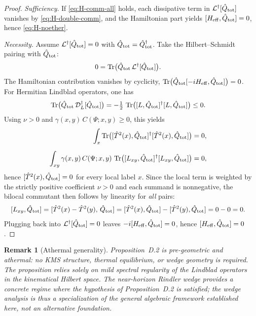 \documentclass[12pt,a4paper]{article}
\newtheorem{remark}{Remark}[section]
\renewcommand{\Tr}{\operatorname{Tr}}
\numberwithin{equation}{section}
\begin{document}
\vspace{0.3cm}
\begin{proof}
\emph{Sufficiency.} If \eqref{eq:H-comm-all} holds, each dissipative term in $\mathcal L^\dagger[\hat Q_{\rm tot}]$ vanishes by \eqref{eq:H-double-comm}, and the Hamiltonian part yields $[H_{\mathrm{eff}},\hat Q_{\rm tot}]=0$, hence \eqref{eq:H-noether}.

\vspace{0.3cm}
\noindent\emph{Necessity.}
Assume $\mathcal L^\dagger[\hat Q_{\rm tot}]=0$ with $\hat Q_{\rm tot}=\hat Q_{\rm tot}^\dagger$.
Take the Hilbert--Schmidt pairing with $\hat Q_{\rm tot}$:
\[
0=\Tr\!\big(\hat Q_{\rm tot}\,\mathcal L^\dagger[\hat Q_{\rm tot}]\big).
\]
The Hamiltonian contribution vanishes by cyclicity,
$\Tr\!\big(\hat Q_{\rm tot}[-iH_{\rm eff},\hat Q_{\rm tot}]\big)=0$.
For Hermitian Lindblad operators, one has
\[
\Tr\!\big(\hat Q_{\rm tot}\,\mathcal D_L^\dagger[\hat Q_{\rm tot}]\big)
=-\tfrac12\,\Tr\!\big([L,\hat Q_{\rm tot}]^\dagger [L,\hat Q_{\rm tot}]\big)\le 0.
\]
Using $\nu>0$ and $\gamma(x,y)\,C(\Psi;x,y)\ge 0$, this yields
\begin{align*}
\int_x \Tr\!\big([\hat T^2(x),\hat Q_{\rm tot}]^\dagger[\hat T^2(x),\hat Q_{\rm tot}]\big) &= 0, \\[6pt]
\int_{xy}\gamma(x,y)\,C(\Psi;x,y)\,
\Tr\!\big([L_{xy},\hat Q_{\rm tot}]^\dagger[L_{xy},\hat Q_{\rm tot}]\big) &= 0,
\end{align*}
hence $[\hat T^2(x),\hat Q_{\rm tot}]=0$ for every local label $x$.
Since the local term is weighted by the strictly positive coefficient $\nu>0$
and each summand is nonnegative, the bilocal commutant then follows by
linearity for \emph{all} pairs:
\[
[L_{xy},\hat Q_{\rm tot}]
=[\hat T^2(x)-\hat T^2(y),\,\hat Q_{\rm tot}]
=[\hat T^2(x),\hat Q_{\rm tot}]-[\hat T^2(y),\hat Q_{\rm tot}]
=0-0=0.
\]
Plugging back into $\mathcal L^\dagger[\hat Q_{\rm tot}]=0$ leaves
$-i[H_{\rm eff},\hat Q_{\rm tot}]=0$, hence $[H_{\rm eff},\hat Q_{\rm tot}]=0$.
\end{proof}

\begin{remark}[Athermal generality]
Proposition~D.2 is pre-geometric and athermal: no KMS structure, thermal equilibrium, or wedge geometry is required. The proposition relies solely on mild spectral regularity of the Lindblad operators in the kinematical Hilbert space. The near-horizon Rindler wedge provides a concrete regime where the hypothesis of Proposition~D.2 is satisfied; the wedge analysis is thus a specialization of the general algebraic framework established here, not an alternative foundation.
\end{remark}
\end{document}
